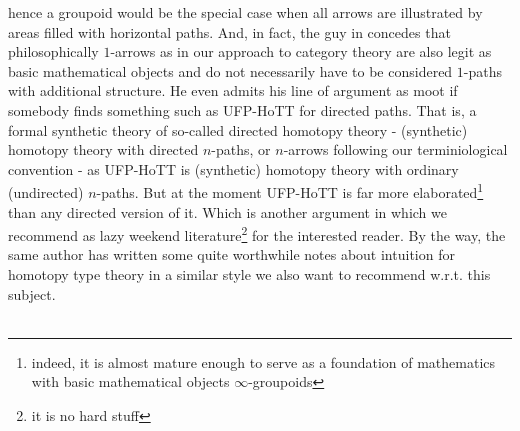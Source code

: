 hence a groupoid would be the special case when all arrows are illustrated by areas filled with horizontal paths. And, in fact, the guy in \cite{e5194763} concedes that philosophically $1$-arrows as in our approach to category theory are also legit as basic mathematical objects and do not necessarily have to be considered $1$-paths with additional structure. He even admits his line of argument as {\glqq}moot{\grqq} if somebody finds something such as UFP-HoTT for directed paths. That is, a formal synthetic theory of so-called {\glqq}directed homotopy theory{\grqq} - (synthetic) homotopy theory with directed $n$-paths, or $n$-arrows following our terminiological convention - as UFP-HoTT is (synthetic) homotopy theory with ordinary (undirected) $n$-paths. But at the moment UFP-HoTT is far more elaborated\footnote{indeed, it is almost mature enough to serve as a foundation of mathematics with basic mathematical objects $\infty$-groupoids} than any directed version of it. Which is another argument in \cite{e5194763} which we recommend as lazy weekend literature\footnote{it is no hard stuff} for the interested reader. By the way, the same author has written some quite worthwhile notes \cite{2d5c2e63} about intuition for homotopy type theory in a similar style we also want to recommend w.r.t. this subject.
\\\\
